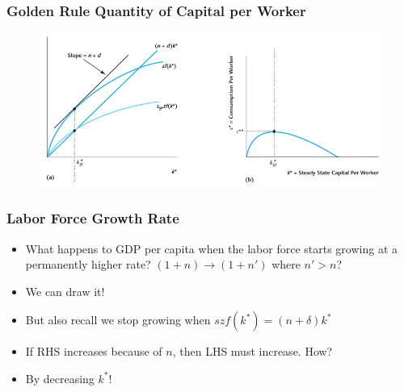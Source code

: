\documentclass{beamer}
\begin{document}
\begin{frame}
\frametitle[alignment=center]{Golden Rule Quantity of Capital per Worker}
\begin{figure}
\centering
\includegraphics[scale=0.5]{Figures/W_Fig_7pt18.png}
\end{figure}
\end{frame}

\begin{frame}
\frametitle[alignment=center]{Labor Force Growth Rate}
\begin{itemize}
\item What happens to GDP per capita when the labor force starts growing at a permanently higher rate? $(1+n)\rightarrow(1+n')$ where $n'>n$?
\bigskip
\item We can draw it!  
\bigskip
\item But also recall we stop growing when $szf(k^*)=(n+\delta)k^*$
\bigskip
\item If RHS increases because of $n$, then LHS must increase.  How?
\bigskip
\item By decreasing $k^*$!  
\end{itemize}
\end{frame}
\end{document}
